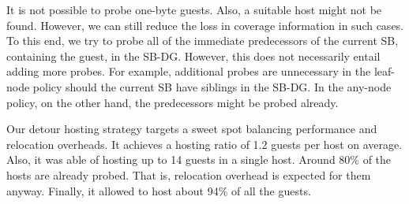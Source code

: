 It is not possible to probe one-byte guests.
Also, a suitable host might not be found.
However, we can still reduce the loss in coverage information in such cases.
To this end, we try to probe all of the immediate predecessors of the current SB, containing the guest, in the SB-DG.
However, this does not necessarily entail adding more probes.
For example, additional probes are unnecessary in the leaf-node policy should the current SB have siblings in the SB-DG.
In the any-node policy, on the other hand, the predecessors might be probed already.

Our detour hosting strategy targets a sweet spot balancing performance and relocation overheads.
It achieves a hosting ratio of 1.2 guests per host on average.
Also, it was able of hosting up to 14 guests in a single host.
Around 80\% of the hosts are already probed. 
That is, relocation overhead is expected for them anyway.
Finally, it allowed {\bcov} to host about 94\% of all the guests.

